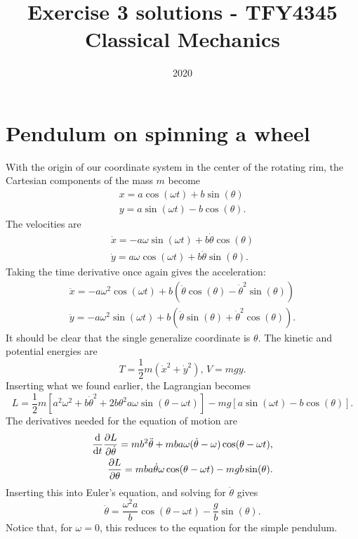 \documentclass{article}
\title{Exercise 3 solutions - TFY4345 Classical Mechanics}
\date{2020}
\begin{document}
    \maketitle
    \section{Pendulum on spinning a wheel}
        With the origin of our coordinate system in the center of the rotating rim, the Cartesian components of the mass $m$ become
        \begin{align*}
            x = a \cos(\omega t) + b \sin(\theta) \\
            y = a \sin(\omega t) - b \cos(\theta).
        \end{align*}
        The velocities are
        \begin{align*}
            \dot x = - a \omega \sin(\omega t) + b \dot \theta \cos(\theta) \\
            \dot y = a \omega \cos(\omega t) + b \dot \theta \sin(\theta).
        \end{align*}
        Taking the time derivative once again gives the acceleration:
        \begin{align*}
            \ddot x = -a \omega^2 \cos(\omega t) + b(\ddot \theta \cos(\theta) - \dot \theta^2 \sin(\theta)) \\
            \ddot y = - a \omega^2 \sin(\omega t) + b(\ddot \theta \sin(\theta) + \dot \theta^2 \cos(\theta)).
        \end{align*}
        It should be clear that the single generalize coordinate is $\theta$. The kinetic and potential energies are 
        \begin{equation*}
            T = \frac{1}{2}m (\dot x^2 + \dot y^2), \, V = mgy.
        \end{equation*}
        Inserting what we found earlier, the Lagrangian becomes
        \begin{equation*}
            L = \frac{1}{2}m[a^2 \omega^2 + b \dot \theta^2 + 2 b \theta^2 a \omega \sin(\theta - \omega t)] - mg[a \sin(\omega t) - b \cos(\theta)].
        \end{equation*}
        The derivatives needed for the equation of motion are
        \begin{align*}
            \dv{t}\pdv{L}{\dot \theta} = mb^2 \ddot \theta + m b a \omega (\dot \theta - \omega) \cos(\theta - \omega t), \\
            \pdv{L}{\theta} = mba \dot \theta \omega \cos(\theta - \omega t) - m g b \sin(\theta).
        \end{align*}
        Inserting this into Euler's equation, and solving for $\ddot \theta$ gives
        \begin{equation*}
            \ddot \theta = \frac{\omega^2 a}{b}\cos(\theta-\omega t) - \frac{g}{b} \sin(\theta).
        \end{equation*}
        Notice that, for $\omega = 0$, this reduces to the equation for the simple pendulum.
\end{document}
